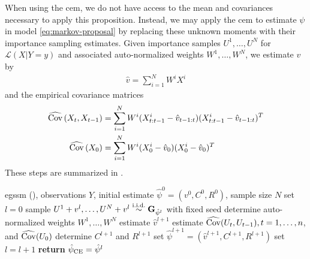 When using the \gls{cem}, we do not have access to the mean and covariances necessary to apply this proposition. Instead, we may apply the \gls{cem} to estimate $\psi$ in model \eqref{eq:markov-proposal} by replacing these unknown moments with their importance sampling estimates. Given importance samples $U^{1}, \dots, U^{N}$ for $\mathcal L (X| Y = y)$ and associated auto-normalized weights $W^{1}, \dots, W^{N}$, we estimate $v$ by 
\begin{align}
\label{eq:hat_v}
\hat v = \sum_{i = 1}^N W^{i}X^{i}
\end{align}
and the empirical covariance matrices
\begin{align}
    \label{eq:empirical_covs}
    \begin{split}
    \widehat{\operatorname{Cov}} \left( X_{t}, X_{t - 1} \right) &= \sum_{i = 1}^N W^{i}(X_{t:t-1}^{i} - \hat v_{t-1:t}) (X_{t:t-1}^{i} - \hat v_{t-1:t})^{T}\\
\widehat{\operatorname{Cov}} \left( X_{0}\right) &= \sum_{i = 1}^N W^{i}(X_{0}^{i} - \hat v_{0}) (X_{0}^{i} - \hat v_{0})^{T}
    \end{split}
\end{align}
These steps are summarized in . 

\begin{algorithm}
    \caption{The \gls{cem} for the Markov proposal \eqref{eq:markov-proposal}}
    \label{alg:cem-markov-proposal}
    \begin{algorithmic}[1]
        \Require \gls{egssm} (), observations $Y$, initial estimate $\hat\psi^0 = \left( v^{0}, C^{0}, R^{0}\right)$, sample size $N$
        \State set $l = 0$
        \Repeat 
            \State\label{step:cem-simulate} sample $U^{1} + v^{l}, \dots, U^{N} + v^{l} \stackrel{\text{i.i.d.}}{\sim} \mathbf G_{\hat\psi^{l}}$ with fixed seed \Comment{\eqref{eq:markov-proposal}} 
            \State\label{step:cem-weights} determine auto-normalized weights $W^{1}, \dots, W^{N}$ \Comment{\eqref{eq:weights_markov}}
            \State\label{step:cem-est_v} estimate $\hat v^{l + 1}$ \Comment{\eqref{eq:hat_v}} 
            \State\label{step:cem-est_cov} estimate $\widehat{\operatorname{Cov}} (U_{t}, U_{t-1}), t=1, \dots, n$, and $\widehat{\operatorname{Cov}} (U_{0})$ \Comment{\eqref{eq:empirical_covs}}
            \State\label{step:cem-C_R} determine $C^{l + 1}$ and $R^{l + 1}$ 
            \State\label{step:cem-est_phi} set $\hat\psi^{l + 1} = \left( \hat v^{l + 1}, C^{l + 1}, R^{l + 1}\right)$ 
            \State\label{step:setllp1} set $l = l + 1$
        \State \textbf{return} ${\hat\psi_{\text{CE}}} = \hat \psi^{l}$
    \end{algorithmic}
\end{algorithm}

